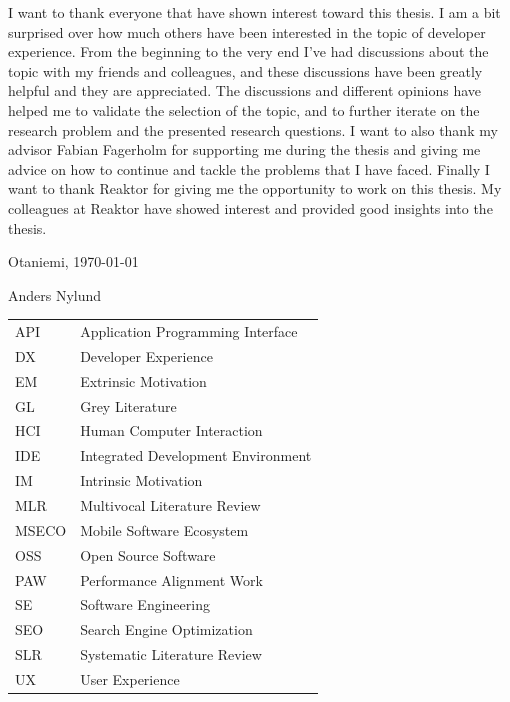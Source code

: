 \documentclass[english, 12pt, a4paper, sci, utf8, a-1b, online]{aaltothesis}
\newcommand{\datenow}{\today}
\begin{document}
I want to thank everyone that have shown interest toward this thesis.  I am a bit surprised over how much others have been interested in the topic of developer experience. From the beginning to the very end I've had discussions about the topic with my friends and colleagues, and these discussions have been greatly helpful and they are appreciated. The discussions and different opinions have helped me to validate the selection of the topic, and to further iterate on the research problem and the presented research questions. I want to also thank my advisor Fabian Fagerholm for supporting me during the thesis and giving me advice on how to continue and tackle the problems that I have faced. Finally I want to thank Reaktor for giving me the opportunity to work on this thesis. My colleagues at Reaktor have showed interest and provided good insights into the thesis.

\vspace{5cm}
Otaniemi, \datenow

\vspace{5mm}
{\hfill Anders Nylund \hspace{1cm}}

\newpage


\thesistableofcontents


\begin{tabular}{ll}
  API   & Application Programming Interface  \\
  DX    & Developer Experience               \\
  EM    & Extrinsic Motivation               \\
  GL    & Grey Literature                    \\
  HCI   & Human Computer Interaction         \\
  IDE   & Integrated Development Environment \\
  IM    & Intrinsic Motivation               \\
  MLR   & Multivocal Literature Review       \\
  MSECO & Mobile Software Ecosystem          \\
  OSS   & Open Source Software               \\
  PAW   & Performance Alignment Work         \\
  SE    & Software Engineering               \\
  SEO   & Search Engine Optimization         \\
  SLR   & Systematic Literature Review       \\
  UX    & User Experience                    \\
\end{tabular}
\end{document}
